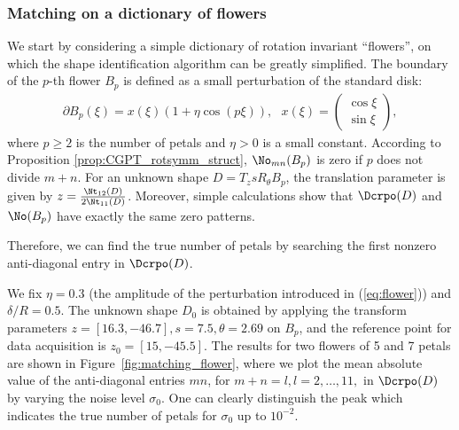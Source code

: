 \subsubsection{Matching on a dictionary of flowers}\label{sec:match-dico-flower}
We start by considering a simple dictionary of rotation invariant
``flowers'', on which the shape identification algorithm can be
greatly simplified. The boundary of the $p$-th flower $B_p$ is
defined as a small perturbation of the standard disk:
\begin{align}
  \partial B_p(\xi) = x(\xi)(1+\eta \cos(p\xi)), \mbox{ } x(\xi)=
  \begin{pmatrix}
    \cos\xi\\ \sin\xi
  \end{pmatrix} ,
  \label{eq:flower}
\end{align}
where $p\geq 2$ is the number of petals and $\eta>0$ is a small
constant. According to Proposition \ref{prop:CGPT_rotsymm_struct},
$\No_{mn}(B_p)$ is zero if $p$ does not divide $m+n$.  For an
unknown shape $D=T_zsR_\theta B_p$, the translation parameter is
given by $z=\frac{\Nt_{12}(D)}{2\Nt_{11}(D)}$. Moreover, simple
calculations show that $\Dcrpo(D)$ and $\No(B_p)$ have exactly the
same zero patterns.


Therefore, we can find the true number of petals by searching the
first nonzero anti-diagonal entry in $\Dcrpo(D)$.

We fix $\eta=0.3$ (the amplitude of the perturbation introduced in
(\ref{eq:flower})) and $\delta/R=0.5$. The unknown shape $D_0$ is
obtained by applying the transform parameters $z=[16.3, -46.7],
s=7.5, \theta=2.69$ on $B_p$, and the reference point for data
acquisition is $z_0=[15, -45.5]$. The results for two flowers of 5
and 7 petals are shown in Figure~\ref{fig:matching_flower}, where
we plot the mean absolute value of the anti-diagonal entries $mn$,
for $m+n =l, l=2, \ldots, 11,$ in $\Dcrpo(D)$ by varying the noise
level $\sigma_0$. One can clearly distinguish the peak which
indicates the true number of petals for $\sigma_0$ up to
$10^{-2}$.

